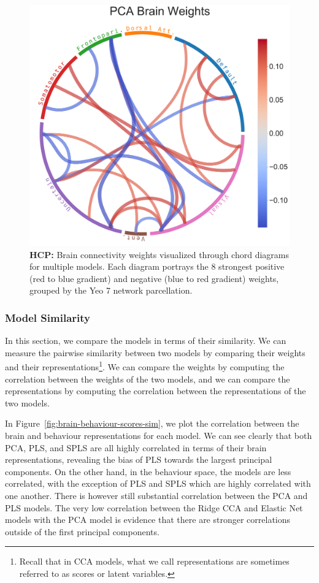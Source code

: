 \begin{figure}[h]
    \includegraphics[width=0.49\linewidth]{figures/hcp/PCA brain weights}
    \caption{\textbf{HCP:} Brain connectivity weights visualized through chord diagrams for multiple models. Each diagram portrays the 8 strongest positive (red to blue gradient) and negative (blue to red gradient) weights, grouped by the Yeo 7 network parcellation.}\label{fig:chord_weights}
\end{figure}

\subsubsection{Model Similarity}

In this section, we compare the models in terms of their similarity. We can measure the pairwise similarity between two models by comparing their weights and their representations\footnote{Recall that in CCA models, what we call representations are sometimes referred to as scores or latent variables.}. We can compare the weights by computing the correlation between the weights of the two models, and we can compare the representations by computing the correlation between the representations of the two models.

In Figure~\ref{fig:brain-behaviour-scores-sim}, we plot the correlation between the brain and behaviour \gls{representations} for each model. 
We can see clearly that both PCA, PLS, and SPLS are all highly correlated in terms of their brain representations, revealing the bias of PLS towards the largest principal components.
On the other hand, in the behaviour space, the models are less correlated, with the exception of PLS and SPLS which are highly correlated with one another. 
There is however still substantial correlation between the PCA and PLS models.
The very low correlation between the Ridge CCA and Elastic Net models with the PCA model is evidence that there are stronger correlations outside of the first principal components.

